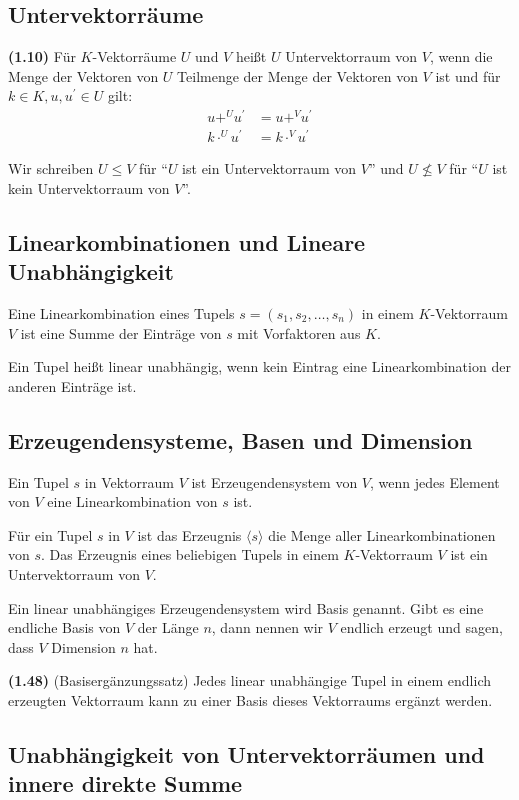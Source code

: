 \documentclass[a4paper,parskip=half*,DIV=15,fontsize=11pt]{scrartcl}
\newlength{\hangwidth}
\newcommand{\skript}[1]{\settowidth{\hangwidth}{\textbf{(#1)} }\hangpara{\hangwidth}{1}\textbf{(#1)} \ignorespaces} %
\begin{document}
\subsection{Untervektorräume}

\skript{1.10} Für $K$-Vektorräume $U$ und $V$ heißt $U$ Untervektorraum von $V$, wenn die Menge der Vektoren von $U$ Teilmenge der Menge der Vektoren von $V$ ist und für $k \in K, u,u^\prime \in U$ gilt:
\begin{align*}
	u {+}^{U} u^\prime &= u {+}^{V} u^\prime	\\
	k \cdot^{U} u^\prime &= k \cdot^{V} u^\prime
\end{align*}

Wir schreiben $U \leq V$ für ``$U$ ist ein Untervektorraum von $V$'' und $U \nleq V$ für ``$U$ ist kein Untervektorraum von $V$''.

\subsection{Linearkombinationen und Lineare Unabhängigkeit}

Eine Linearkombination eines Tupels $s = (s_1,s_2, \ldots, s_n)$ in einem $K$-Vektorraum $V$ ist eine Summe der Einträge von $s$ mit Vorfaktoren aus $K$.

Ein Tupel heißt linear unabhängig, wenn kein Eintrag eine Linearkombination der anderen Einträge ist.

\subsection{Erzeugendensysteme, Basen und Dimension}

Ein Tupel $s$ in Vektorraum $V$ ist Erzeugendensystem von $V$, wenn jedes Element von $V$ eine Linearkombination von $s$ ist.

Für ein Tupel $s$ in $V$ ist das Erzeugnis $\langle s \rangle$ die Menge aller Linearkombinationen von $s$. Das Erzeugnis eines beliebigen Tupels in einem $K$-Vektorraum $V$ ist ein Untervektorraum von $V$.

Ein linear unabhängiges Erzeugendensystem wird Basis genannt. Gibt es eine endliche Basis von $V$ der Länge $n$, dann nennen wir $V$ endlich erzeugt und sagen, dass $V$ Dimension $n$ hat.

\skript{1.48} (Basisergänzungssatz) Jedes linear unabhängige Tupel in einem endlich erzeugten Vektorraum kann zu einer Basis dieses Vektorraums ergänzt werden.

\subsection{Unabhängigkeit von Untervektorräumen und innere direkte Summe}
\end{document}
